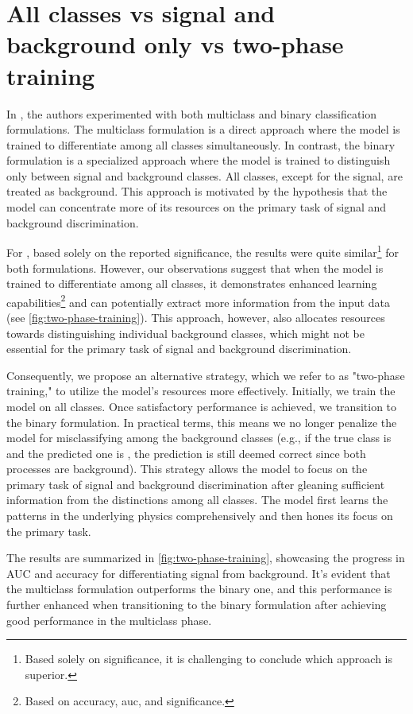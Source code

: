 \section{All classes vs signal and background only vs two-phase training}
\label{sec:binary}

In \cite{severin}, the authors experimented with both multiclass and binary classification formulations. The multiclass
formulation is a direct approach where the model is trained to differentiate among all classes simultaneously. In
contrast, the binary formulation is a specialized approach where the model is trained to distinguish only between signal
and background classes. All classes, except for the signal, are treated as background. This approach is motivated by the
hypothesis that the model can concentrate more of its resources on the primary task of signal and background
discrimination.

For \cite{severin}, based solely on the reported significance, the results were quite similar\footnote{Based solely on
    significance, it is challenging to conclude which approach is superior.} for both formulations. However, our
observations suggest that when the model is trained to differentiate among all classes, it demonstrates enhanced
learning capabilities\footnote{Based on accuracy, \gls{auc}, and significance.} and can potentially extract more
information from the input data (see \autoref{fig:two-phase-training}). This approach, however, also allocates resources
towards distinguishing individual background classes, which might not be essential for the primary task of signal and
background discrimination.

Consequently, we propose an alternative strategy, which we refer to as "two-phase training," to utilize the model's
resources more effectively. Initially, we train the model on all classes. Once satisfactory performance is achieved, we
transition to the binary formulation. In practical terms, this means we no longer penalize the model for misclassifying
among the background classes (e.g., if the true class is \ttw and the predicted one is \ttz, the prediction is still
deemed correct since both processes are background). This strategy allows the model to focus on the primary task of
signal and background discrimination after gleaning sufficient information from the distinctions among all classes. The
model first learns the patterns in the underlying physics comprehensively and then hones its focus on the primary task.

The results are summarized in \autoref{fig:two-phase-training}, showcasing the progress in AUC and accuracy for
differentiating signal from background. It's evident that the multiclass formulation outperforms the binary one, and
this performance is further enhanced when transitioning to the binary formulation after achieving good performance in
the multiclass phase.


